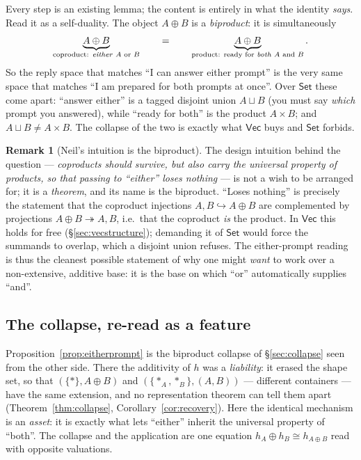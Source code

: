 \documentclass[11pt]{amsart}
\theoremstyle{plain}
\theoremstyle{definition}
\newtheorem{remark}[theorem]{Remark}
\renewcommand{\Vec}{\mathsf{Vec}}
\newcommand{\Set}{\mathsf{Set}}
\newcommand{\iso}{\cong}
\begin{document}
Every step is an existing lemma; the content is entirely in what the identity
\emph{says}. Read it as a self-duality. The object $A\oplus B$ is a \emph{biproduct}:
it is simultaneously
\[
  \underbrace{A\oplus B}_{\text{coproduct: \emph{either} $A$ or $B$}}
  \qquad=\qquad
  \underbrace{A\oplus B}_{\text{product: ready for \emph{both} $A$ and $B$}} .
\]
So the reply space that matches ``I can answer either prompt'' is the very same space
that matches ``I am prepared for both prompts at once''. Over $\Set$ these come apart:
``answer either'' is a tagged disjoint union $A\sqcup B$ (you must say \emph{which}
prompt you answered), while ``ready for both'' is the product $A\times B$; and
$A\sqcup B\neq A\times B$. The collapse of the two is exactly what $\Vec$ buys and
$\Set$ forbids.

\begin{remark}[Neil's intuition is the biproduct]\label{rem:neil-biproduct}
The design intuition behind the question --- \emph{coproducts should survive, but also
carry the universal property of products, so that passing to ``either'' loses nothing}
--- is not a wish to be arranged for; it is a \emph{theorem}, and its name is the
biproduct. ``Loses nothing'' is precisely the statement that the coproduct injections
$A,B\hookrightarrow A\oplus B$ are complemented by projections
$A\oplus B\twoheadrightarrow A,B$, i.e.\ that the coproduct \emph{is} the product. In
$\Vec$ this holds for free (\S\ref{sec:vecstructure}); demanding it of $\Set$ would
force the summands to overlap, which a disjoint union refuses. The either-prompt reading
is thus the cleanest possible statement of why one might \emph{want} to work over a
non-extensive, additive base: it is the base on which ``or'' automatically supplies
``and''.
\end{remark}

\subsection{The collapse, re-read as a feature}

Proposition~\ref{prop:eitherprompt} is the biproduct collapse of \S\ref{sec:collapse}
seen from the other side. There the additivity of $h$ was a \emph{liability}: it erased
the shape set, so that $(\{*\},A\oplus B)$ and $(\{*_A,*_B\},(A,B))$ --- different
containers --- have the same extension, and no representation theorem can tell them
apart (Theorem~\ref{thm:collapse}, Corollary~\ref{cor:recovery}). Here the identical
mechanism is an \emph{asset}: it is exactly what lets ``either'' inherit the universal
property of ``both''. The collapse and the application are one equation
$h_A\oplus h_B\iso h_{A\oplus B}$ read with opposite valuations.
\end{document}
